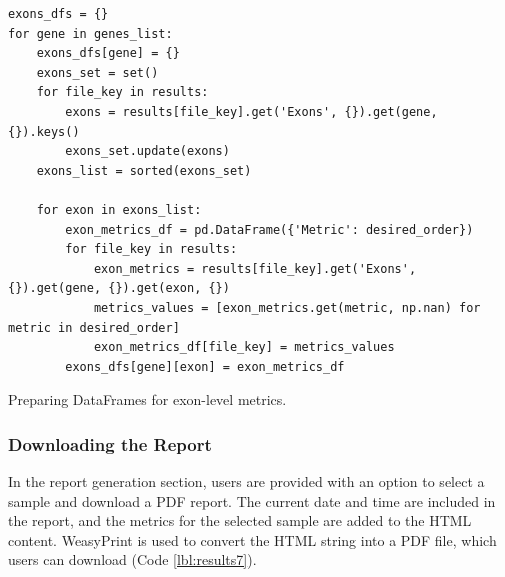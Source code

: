 \begin{longlisting}
\begin{verbatim}
exons_dfs = {}
for gene in genes_list:
    exons_dfs[gene] = {}
    exons_set = set()
    for file_key in results:
        exons = results[file_key].get('Exons', {}).get(gene, {}).keys()
        exons_set.update(exons)
    exons_list = sorted(exons_set)

    for exon in exons_list:
        exon_metrics_df = pd.DataFrame({'Metric': desired_order})
        for file_key in results:
            exon_metrics = results[file_key].get('Exons', {}).get(gene, {}).get(exon, {})
            metrics_values = [exon_metrics.get(metric, np.nan) for metric in desired_order]
            exon_metrics_df[file_key] = metrics_values
        exons_dfs[gene][exon] = exon_metrics_df
\end{verbatim}
\caption{Preparing DataFrames for exon-level metrics.}
\label{lbl:results6}
\end{longlisting}

\subsubsection{\textbf{Downloading the Report}}

In the report generation section, users are provided with an option to select a sample and download a PDF report. The current date and time are included in the report, and the metrics for the selected sample are added to the HTML content. WeasyPrint is used to convert the HTML string into a PDF file, which users can download (Code \ref{lbl:results7}).

